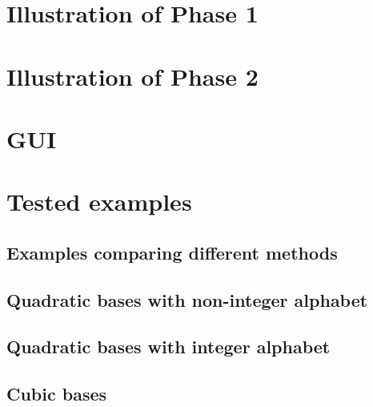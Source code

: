 \section{Illustration of Phase 1}
\section{Illustration of Phase 2}

\section{GUI}
\section{Tested examples}

\subsection*{Examples comparing different methods}



\subsection*{Quadratic bases with non-integer alphabet}


\subsection*{Quadratic bases with integer alphabet}


\subsection*{Cubic bases}
